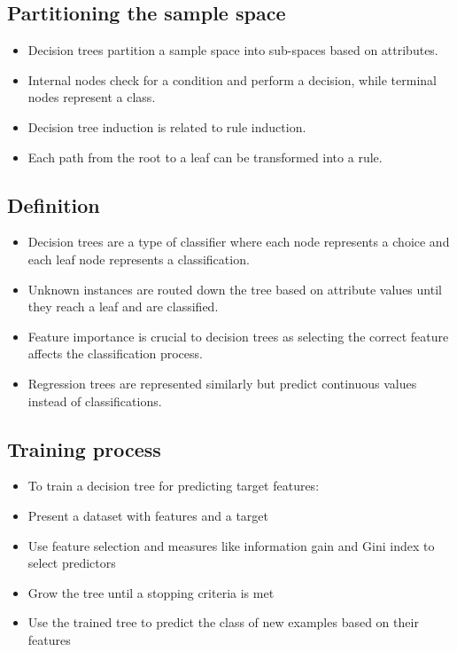 \documentclass[11pt]{article}
\providecommand{\tightlist}{%
      \setlength{\itemsep}{0pt}\setlength{\parskip}{0pt}}
\begin{document}
\hypertarget{partitioning-the-sample-space}{%
\subsection{Partitioning the sample
space}\label{partitioning-the-sample-space}}

\begin{itemize}
\tightlist
\item
  Decision trees partition a sample space into sub-spaces based on
  attributes.
\item
  Internal nodes check for a condition and perform a decision, while
  terminal nodes represent a class.
\item
  Decision tree induction is related to rule induction.
\item
  Each path from the root to a leaf can be transformed into a rule.
\end{itemize}

\hypertarget{definition}{%
\subsection{Definition}\label{definition}}

\begin{itemize}
\tightlist
\item
  Decision trees are a type of classifier where each node represents a
  choice and each leaf node represents a classification.
\item
  Unknown instances are routed down the tree based on attribute values
  until they reach a leaf and are classified.
\item
  Feature importance is crucial to decision trees as selecting the
  correct feature affects the classification process.
\item
  Regression trees are represented similarly but predict continuous
  values instead of classifications.
\end{itemize}

\hypertarget{training-process}{%
\subsection{Training process}\label{training-process}}

\begin{itemize}
\tightlist
\item
  To train a decision tree for predicting target features:
\item
  Present a dataset with features and a target
\item
  Use feature selection and measures like information gain and Gini
  index to select predictors
\item
  Grow the tree until a stopping criteria is met
\item
  Use the trained tree to predict the class of new examples based on
  their features
\end{itemize}
\end{document}
